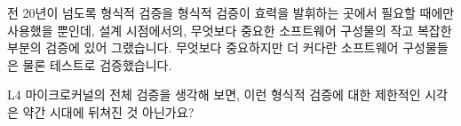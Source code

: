 전 20년이 넘도록 형식적 검증을 형식적 검증이 효력을 발휘하는 곳에서 필요할
때에만 사용했을 뿐인데, 설계 시점에서의, 무엇보다 중요한 소프트웨어 구성물의
작고 복잡한 부분의 검증에 있어 그랬습니다.
무엇보다 중요하지만 더 커다란 소프트웨어 구성물들은 물론 테스트로 검증했습니다.
\iffalse

Another approach is to consider that
formal verification is often much harder to use than is testing.
This is of course in part a cultural statement, and there is every reason
to hope that formal verification will be perceived to be easier as more
people become familiar with it.
That said, very simple test harnesses can find significant bugs in arbitrarily
large software systems.
In contrast, the effort required to apply formal verification seems to
increase dramatically as the system size increases.

I have nevertheless made occasional use of formal verification
for more than 20 years, playing to formal verification's strengths,
namely design-time verification of small complex portions of the overarching
software construct.
The larger overarching software construct is of course validated by testing.
\fi

\QuickQuiz{}
	L4 마이크로커널의 전체 검증을 생각해 보면, 이런 형식적 검증에 대한
	제한적인 시각은 약간 시대에 뒤쳐진 것 아닌가요?
	\iffalse

